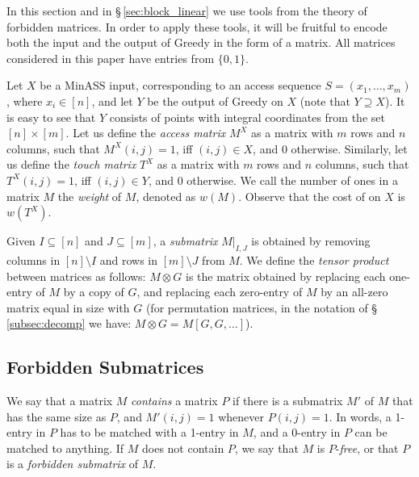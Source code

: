 In this section and in \S\,\ref{sec:block_linear} we use tools from the theory of forbidden matrices. In order to apply these tools, it will be fruitful to encode both the input and the output of {\sc Greedy} in the form of a matrix. All matrices considered in this paper have entries from $\{0,1\}$.


Let $X$ be a {\sc MinASS} input, corresponding to an access sequence $S = (x_1,\dots, x_m)$, where $x_i \in [n]$, and let $Y$ be the output of {\sc Greedy} on $X$ (note that $Y \supseteq X$). It is easy to see that $Y$ consists of points with integral coordinates from the set $[n] \times [m]$. %
Let us define the \emph{access matrix} $M^X$ as a matrix with $m$ rows and $n$ columns, such that $M^X(i,j) = 1$, iff $(i,j) \in X$, and 0 otherwise. Similarly, let us define the \emph{touch matrix} $T^X$ as a matrix with $m$ rows and $n$ columns, such that $T^X(i,j) = 1$, iff $(i,j) \in Y$, and 0 otherwise. We call the number of ones in a matrix $M$ the \emph{weight} of $M$, denoted as $w(M)$. Observe that the cost of \greedy on $X$ is $w(T^X)$.

Given $I \subseteq [n]$ and $J \subseteq [m]$, a \emph{submatrix} $M|_{I,J}$ is obtained by removing columns in $[n] \setminus I$ and rows in $[m] \setminus J$ from $M$.   
%
We define the \emph{tensor product} between matrices as follows: $M \otimes G$ is the matrix obtained by replacing each one-entry of $M$ by a copy of $G$, and replacing each zero-entry of $M$ by an all-zero matrix equal in size with $G$ (for permutation matrices, in the notation of \S\,\ref{subsec:decomp} we have: $M \otimes G = M[G,G,\dots]$).

\subsection{Forbidden Submatrices}

We say that a matrix $M$ \emph{contains} a matrix $P$ if there is a submatrix $M'$ of $M$ that has the same size as $P$, and $M'(i,j)=1$ whenever $P(i,j)=1$. In words, a 1-entry in $P$ has to be matched with a 1-entry in $M$, and a 0-entry in $P$ can be matched to anything. If $M$ does not contain $P$, we say that $M$ is $P$-\emph{free}, or that $P$ is a \emph{forbidden submatrix} of $M$.

